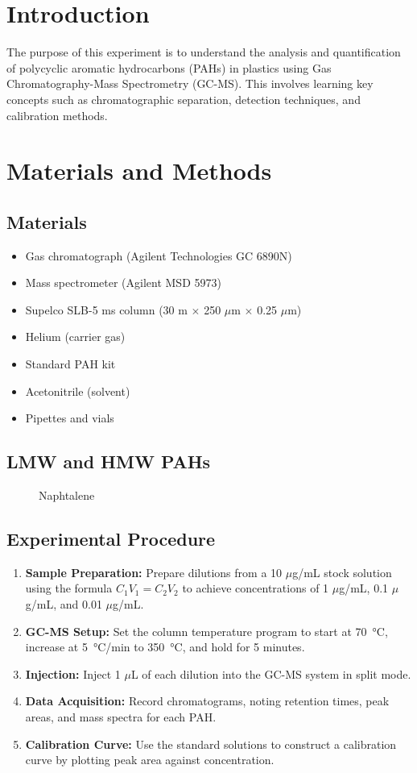 \documentclass{article}
\newcommand{\cfig}[3]{
    \begin{figure}[ht!]
        \centering
        \chemfig{#1}
        \label{#2}
        \caption{#3}
    \end{figure}
}
\begin{document}
\section{Introduction}
The purpose of this experiment is to understand the analysis and quantification of polycyclic aromatic hydrocarbons (PAHs) in plastics using Gas Chromatography-Mass Spectrometry (GC-MS). This involves learning key concepts such as chromatographic separation, detection techniques, and calibration methods.

\section{Materials and Methods}
\subsection{Materials}
\begin{itemize}
    \item Gas chromatograph (Agilent Technologies GC 6890N)
    \item Mass spectrometer (Agilent MSD 5973)
    \item Supelco SLB-5 ms column (30 m $\times$ 250 $\mu$m $\times$ 0.25 $\mu$m)
    \item Helium (carrier gas)
    \item Standard PAH kit
    \item Acetonitrile (solvent)
    \item Pipettes and vials
\end{itemize}

\subsection{LMW and HMW PAHs}
\cfig{[:0]*6(=-*6(-=-=-)=-=-)}{ch:naphtalene}{Naphtalene}

\cfig{}{}{}

\subsection{Experimental Procedure}
\begin{enumerate}
    \item \textbf{Sample Preparation:} Prepare dilutions from a 10 $\mu$g/mL stock solution using the formula \(C_1V_1 = C_2V_2\) to achieve concentrations of 1 $\mu$g/mL, 0.1 $\mu$g/mL, and 0.01 $\mu$g/mL.
    \item \textbf{GC-MS Setup:} Set the column temperature program to start at \SI{70}{\degreeCelsius}, increase at \SI{5}{\degreeCelsius}/min to \SI{350}{\degreeCelsius}, and hold for 5 minutes.
    \item \textbf{Injection:} Inject 1 $\mu$L of each dilution into the GC-MS system in split mode.
    \item \textbf{Data Acquisition:} Record chromatograms, noting retention times, peak areas, and mass spectra for each PAH.
    \item \textbf{Calibration Curve:} Use the standard solutions to construct a calibration curve by plotting peak area against concentration.
\end{enumerate}
\end{document}
